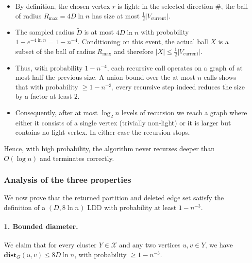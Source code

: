 \begin{itemize}
    \item By definition, the chosen vertex $r$ is light: in the selected direction $\#$, the ball of radius $R_{\max} = 4D\ln n$ has size at most $\frac12 |V_{\text{current}}|$.
    \item The sampled radius $\tilde D$ is at most $4D\ln n$ with probability $1 - e^{-4\ln n} = 1 - n^{-4}$. Conditioning on this event, the actual ball $X$ is a subset of the ball of radius $R_{\max}$ and therefore $|X| \le \frac12 |V_{\text{current}}|$.
    \item Thus, with probability $1 - n^{-4}$, each recursive call operates on a graph of at most half the previous size. A union bound over the at most $n$ calls shows that with probability $\ge 1 - n^{-3}$, every recursive step indeed reduces the size by a factor at least $2$.
    \item Consequently, after at most $\log_2 n$ levels of recursion we reach a graph where either it consists of a single vertex (trivially non‑light) or it is larger but contains no light vertex. In either case the recursion stops.
\end{itemize}

Hence, with high probability, the algorithm never recurses deeper than $O(\log n)$ and terminates correctly.

\subsubsection{Analysis of the three properties}

We now prove that the returned partition and deleted edge set satisfy the definition of a $(D, 8\ln n)$ LDD with probability at least $1 - n^{-3}$.

\paragraph{1. Bounded diameter.}
We claim that for every cluster $Y \in \mathcal{X}$ and any two vertices $u,v \in Y$, we have $\mathbf{dist}_G(u,v) \le 8D\ln n$, with probability $\ge 1 - n^{-3}$.

